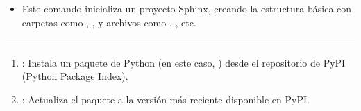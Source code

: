 \documentclass[a4paper,10pt,spanish]{sphinxmanual}
\begin{document}
\subsection{}
\label{\detokenize{comandos_mas_usados/comandos:configuracion-inicial-del-proyecto-sphinx}}

\subsubsection{}
\label{\detokenize{comandos_mas_usados/comandos:comando-para-iniciar-un-proyecto-sphinx}}
\begin{sphinxVerbatim}[commandchars=\\\{\}]
\end{sphinxVerbatim}
\begin{itemize}
\item {} 
\sphinxAtStartPar
Este comando inicializa un proyecto Sphinx, creando la estructura básica con carpetas como , , y archivos como , , etc.

\end{itemize}


\bigskip\hrule\bigskip



\subsubsection{}
\label{\detokenize{comandos_mas_usados/comandos:comando-para-actualizar-la-version-de-sphinx}}
\begin{sphinxVerbatim}[commandchars=\\\{\}]
   
\end{sphinxVerbatim}
\begin{enumerate}
%
\item {} 
\sphinxAtStartPar
{}: Instala un paquete de Python (en este caso, ) desde el repositorio de PyPI (Python Package Index).

\item {} 
\sphinxAtStartPar
{}: Actualiza el paquete a la versión más reciente disponible en PyPI.

\end{enumerate}
\end{document}
